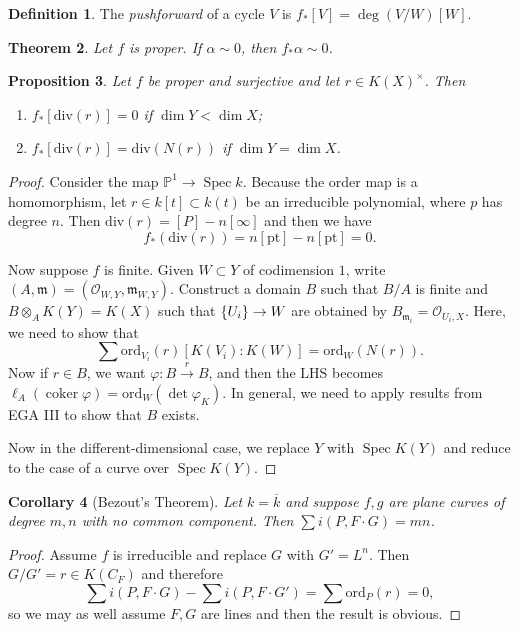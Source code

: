 \documentclass[leqno, openany]{memoir}
\newtheorem{thm}{Theorem}[section]
\newtheorem{cor}[thm]{Corollary}
\newtheorem{prop}[thm]{Proposition}
\theoremstyle{definition}
\newtheorem{defn}[thm]{Definition}
\theoremstyle{remark}
\theoremstyle{plain}
\theoremstyle{definition}
\theoremstyle{remark}
\renewcommand{\P}{\mathbb{P}}
\newcommand{\msc}[1]{\mathscr{#1}}
\newcommand{\mf}[1]{\mathfrak{#1}}
\newcommand{\mr}[1]{\mathrm{#1}}
\newcommand{\ol}[1]{\overline{#1}}
\DeclareMathOperator{\Spec}{Spec}
\begin{document}
\begin{defn}
    The \textit{pushforward}  of a cycle $V$ is $f_* [V] = \deg(V/W) [W]$.
\end{defn}

\begin{thm}
    Let $f$ is proper. If $\alpha \sim 0$, then $f_* \alpha \sim 0$.
\end{thm}

\begin{prop}
    Let $f$ be proper and surjective and let $r \in {K(X)}^{\times}$. Then
    \begin{enumerate}
        \item $f_* [ \mr{div}(r) ] = 0$ if $\dim Y < \dim X$;
        \item $f_* [\mr{div}(r)] = \mr{div}(N(r))$ if $\dim Y = \dim X$.
    \end{enumerate}
\end{prop}

\begin{proof}
    Consider the map $\P^1 \to \Spec k$. Because the order map is a homomorphism, let $r \in k[t] \subset k(t)$ be an irreducible polynomial, where $p$ has degree $n$. Then $\mr{div}(r) = [P] - n [\infty]$ and then we have
    \[ f_* (\mr{div}(r)) = n[\mr{pt}] - n [\mr{pt}] = 0. \]

    Now suppose $f$ is finite. Given $W \subset Y$ of codimension $1$, write $(A, \mf{m}) = (\msc{O}_{W,Y}, \mf{m}_{W,Y})$. Construct a domain $B$ such that $B/A$ is finite and $B \otimes_A K(Y) = K(X)$ such that $\qty{U_i} \to W$ are obtained by $B_{\mf{m}_i} = \msc{O}_{U_i, X}$. Here, we need to show that
    \[ \sum \mr{ord}_{V_i}(r) [K(V_i) \colon K(W)] = \mr{ord}_W(N(r)). \]
    Now if $r \in B$, we want $\varphi \colon B \xrightarrow{r} B$, and then the LHS becomes $\ell_A(\operatorname{coker} \varphi) = \mr{ord}_W(\det \varphi_K)$. In general, we need to apply results from EGA III to show that $B$ exists.

    Now in the different-dimensional case, we replace $Y$ with $\Spec K(Y)$ and reduce to the case of a curve over $\Spec K(Y)$.
\end{proof}

\begin{cor}[Bezout's Theorem]
    Let $k = \ol{k}$ and suppose $f,g$ are plane curves of degree $m,n$ with no common component. Then $\sum i(P, F \cdot G) = mn$.
\end{cor}

\begin{proof}
    Assume $f$ is irreducible and replace $G$ with $G' = L^n$. Then $G/G' = r \in K(C_F)$ and therefore
    \[ \sum i(P, F \cdot G) - \sum i(P, F \cdot G') = \sum \mr{ord}_P(r) = 0, \]
    so we may as well assume $F,G$ are lines and then the result is obvious.
\end{proof}
\end{document}
